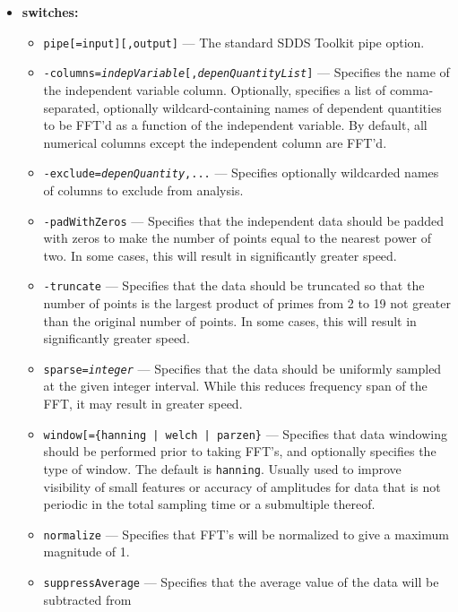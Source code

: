 \begin{itemize}
{\em outputFile} also contains two parameters, {\tt fftFrequencies} and {\tt fftFrequencySpacing}, giving
the number of frequencies and the frequency spacing, respectively.

\item {\bf switches:}
    \begin{itemize}
    \item \verb|pipe[=input][,output]| --- The standard SDDS Toolkit pipe option.
    \item {\tt -columns={\em indepVariable}[,{\em depenQuantityList}]} --- Specifies the name of the
        independent variable column.  Optionally, specifies a list of comma-separated, optionally
        wildcard-containing names of dependent quantities to be FFT'd as a function of the independent variable. 
        By default, all numerical columns except the independent column are FFT'd.
    \item {\tt -exclude={\em depenQuantity},...} --- Specifies optionally wildcarded names of columns
        to exclude from analysis.
    \item \verb|-padWithZeros| --- Specifies that the independent data should be padded with zeros to
        make the number of points equal to the nearest power of two.  In some cases, this will result in
        significantly greater speed.
    \item \verb|-truncate| --- Specifies that the data should be truncated so that the number of points is 
        the largest product of primes from 2 to 19 not greater than the original number of points.  
        In some cases, this will result in significantly greater speed.
    \item {\tt sparse={\em integer}} --- Specifies that the data should be uniformly sampled at the
        given integer interval.  While this reduces frequency span of the FFT, it may result in greater
        speed.
    \item {\tt window[=\{hanning | welch | parzen\}} --- Specifies that data windowing should be performed
        prior to taking FFT's, and optionally specifies the type of window.  The default is {\tt hanning}.
        Usually used to improve visibility of small features or accuracy of amplitudes for data that is
        not periodic in the total sampling time or a submultiple thereof.
    \item \verb|normalize| --- Specifies that FFT's will be normalized to give a maximum magnitude of 1.
    \item \verb|suppressAverage| --- Specifies that the average value of the data will be subtracted from

\end{itemize}
\end{itemize}

